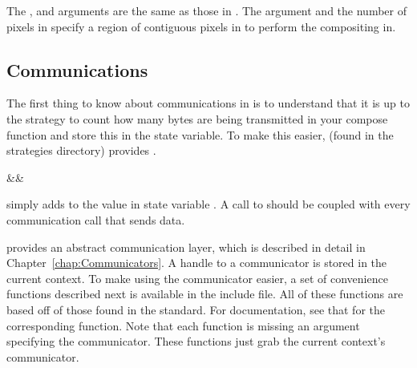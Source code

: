 The ,  and  arguments are
the same as those in .  The 
argument and the number of pixels in  specify a region of
contiguous pixels in  to perform the compositing in.

\subsection{Communications}

The first thing to know about communications in \IceT is to understand that
it is up to the strategy to count how many bytes are being transmitted in
your compose function and store this in the  state
variable.  To make this easier,  (found in
the strategies directory) provides .

\label{manpage:icetAddSentBytes}
\begin{Table}{3}
  \textC{(}&&\quad\textC{);}
\end{Table}

 simply adds  to the value in
state variable .  A call to
 should be coupled with every communication call
that sends data.

\IceT provides an abstract communication layer, which is described in
detail in Chapter~\ref{chap:Communicators}.  A handle to a communicator is
stored in the current context.  To make using the communicator easier, a
set of convenience functions described next is available in the
 include file.  All of these functions
are based off of those found in the \MPI standard.  For documentation, see
that for the corresponding \MPI function.  Note that each function is
missing an argument specifying the communicator.  These functions just grab
the current context's communicator.

\renewcommand{\currentmansection}{ICET\_COMM\_DUPLICATE}
\begin{Table}{3}
  \textC{ *}
\end{Table}

\renewcommand{\currentmansection}{ICET\_COMM\_DESTROY}
\begin{Table}{3}
\end{Table}

